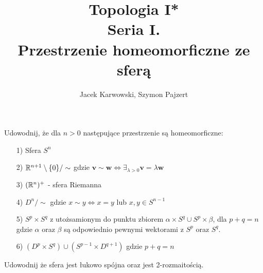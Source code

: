 \title{\textbf{Topologia I* \\ Seria I. \\ Przestrzenie homeomorficzne ze sferą}}
\date{}
\author{Jacek Karwowski, Szymon Pajzert}
\maketitle
Udowodnij, że dla $n > 0$ następujące przestrzenie są homeomorficzne:
\begin{enumerate}
  \item[1)] Sfera $S^n$
  \item[2)] ${\mathbb{R}} ^ {n+1} \setminus \{ 0 \} / \sim $ gdzie $ \mathbf{v} \sim  \mathbf{w} \iff \exists_{\lambda > 0}  \mathbf{v}=  \lambda \mathbf{w} $
  \item[3)] $({\mathbb{R}}^n)^+$ - sfera Riemanna
  \item[4)] $D ^ {n} / \sim $ gdzie $ x \sim y \iff x = y $ lub $ x, y \in S^{n-1} $
  \item[5)] $S^p \times S^q$ z utożsamionym do punktu zbiorem $\alpha \times S^q \cup S^p \times \beta$, dla $p + q = n$ gdzie $\alpha$ oraz $\beta$ są odpowiednio pewnymi wektorami z $S^p$ oraz $S^q$.
  \item[6)] $(D^p \times S^q) \cup (S^{p-1} \times D^{q+1})$ gdzie $p+q = n$
\end{enumerate}
Udowodnij że sfera jest łukowo spójna oraz jest 2-rozmaitością.
